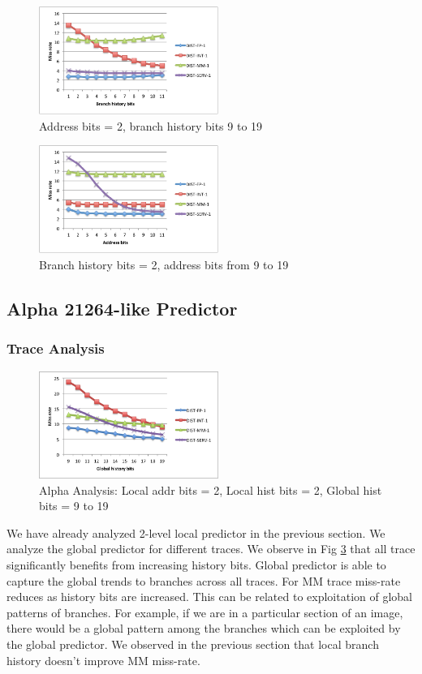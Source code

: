 \documentclass[conference]{IEEEtran}
\begin{document}
\begin{figure}[!t]
    \centering
    \includegraphics[width=2.3in]{analysis_local_2}
    \caption{Address bits = 2, branch history bits 9 to 19}
    \label{anlys_local_hist}
\end{figure}

\begin{figure}[!t]
    \centering
    \includegraphics[width=2.3in]{analysis_local_1}
    \caption{Branch history bits = 2, address bits from 9 to 19}
    \label{anlys_local_addr}
\end{figure}


\subsection{Alpha 21264-like Predictor}
\subsubsection{Trace Analysis}
\begin{figure}[!t]
    \centering
    \includegraphics[width=2.3in]{analysis_alpha_ghist.png}
    \caption{Alpha Analysis: Local addr bits = 2, Local hist bits = 2, Global hist bits = 9 to 19}
    \label{anys_alpha_his}
\end{figure}
We have already analyzed 2-level local predictor in the previous section. We analyze the global predictor for different traces. We observe in Fig \ref{anys_alpha_his} that all trace significantly benefits from increasing history bits. Global predictor is able to capture the global trends to branches across all traces. For MM trace miss-rate reduces as history bits are increased. This can be related to exploitation of global patterns of branches. For example, if we are in a particular section of an image, there would be a global pattern among the branches which can be exploited by the global predictor. We observed in the previous section that local branch history doesn't improve MM miss-rate.
\end{document}
